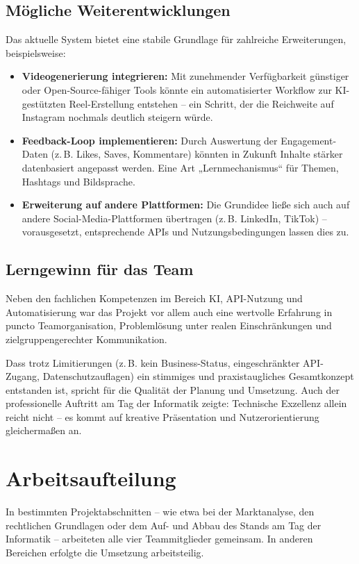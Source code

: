 \documentclass[a4paper,12pt]{article}
\begin{document}
\subsection{Mögliche Weiterentwicklungen}

Das aktuelle System bietet eine stabile Grundlage für zahlreiche Erweiterungen, beispielsweise:

\begin{itemize}
    \item \textbf{Videogenerierung integrieren:} Mit zunehmender Verfügbarkeit günstiger oder Open-Source-fähiger Tools könnte ein automatisierter Workflow zur KI-gestützten Reel-Erstellung entstehen – ein Schritt, der die Reichweite auf Instagram nochmals deutlich steigern würde.
    \item \textbf{Feedback-Loop implementieren:} Durch Auswertung der Engagement-Daten (z.\,B. Likes, Saves, Kommentare) könnten in Zukunft Inhalte stärker datenbasiert angepasst werden. Eine Art „Lernmechanismus“ für Themen, Hashtags und Bildsprache.
    \item \textbf{Erweiterung auf andere Plattformen:} Die Grundidee ließe sich auch auf andere Social-Media-Plattformen übertragen (z.\,B. LinkedIn, TikTok) – vorausgesetzt, entsprechende APIs und Nutzungsbedingungen lassen dies zu.
\end{itemize}

\subsection{Lerngewinn für das Team}

Neben den fachlichen Kompetenzen im Bereich KI, API-Nutzung und Automatisierung war das Projekt vor allem auch eine wertvolle Erfahrung in puncto Teamorganisation, Problemlösung unter realen Einschränkungen und zielgruppengerechter Kommunikation. 

Dass trotz Limitierungen (z.\,B. kein Business-Status, eingeschränkter API-Zugang, Datenschutzauflagen) ein stimmiges und praxistaugliches Gesamtkonzept entstanden ist, spricht für die Qualität der Planung und Umsetzung. Auch der professionelle Auftritt am Tag der Informatik zeigte: Technische Exzellenz allein reicht nicht – es kommt auf kreative Präsentation und Nutzerorientierung gleichermaßen an.


\section{Arbeitsaufteilung}
In bestimmten Projektabschnitten – wie etwa bei der Marktanalyse, den rechtlichen Grundlagen oder dem Auf- und Abbau des Stands am Tag der Informatik – arbeiteten alle vier Teammitglieder gemeinsam. In anderen Bereichen erfolgte die Umsetzung arbeitsteilig.
\end{document}
